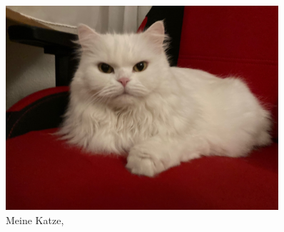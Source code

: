 \documentclass[12pt,ngerman,parskip=half]{scrreprt}
\begin{document}
\begin{figure}[hbtp!]%
\begin{center}
\includegraphics[width=0.9\textwidth]{Bilder/Katze}
\end{center}
\caption{Meine Katze, \blindtext}
\end{figure}


\blindtext
\end{document}
